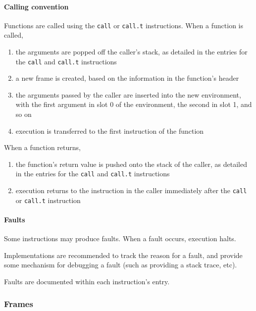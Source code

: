 \paragraph{Calling convention}

Functions are called using the \texttt{call} or \texttt{call.t}
instructions. When a function is called,

\begin{enumerate}
\item
  the arguments are popped off the caller's stack, as detailed in the
  entries for the \texttt{call} and \texttt{call.t} instructions
\item
  a new frame is created, based on the information in the function's
  header
\item
  the arguments passed by the caller are inserted into the new
  environment, with the first argument in slot 0 of the environment, the
  second in slot 1, and so on
\item
  execution is transferred to the first instruction of the function
\end{enumerate}

When a function returns,

\begin{enumerate}
\item
  the function's return value is pushed onto the stack of the caller, as
  detailed in the entries for the \texttt{call} and \texttt{call.t}
  instructions
\item
  execution returns to the instruction in the caller immediately after
  the \texttt{call} or \texttt{call.t} instruction
\end{enumerate}

\paragraph{Faults}

Some instructions may produce faults. When a fault occurs, execution
halts.

Implementations are recommended to track the reason for a fault, and
provide some mechanism for debugging a fault (such as providing a stack
trace, etc).

Faults are documented within each instruction's entry.

\subsubsection{Frames}

